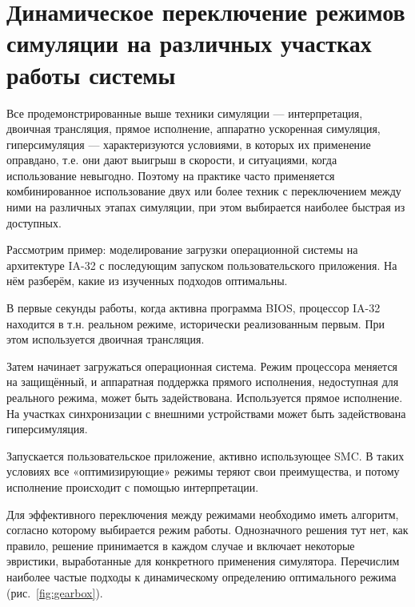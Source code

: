 \section[Динамическое  переключение режимов симуляции]{Динамическое  переключение режимов симуляции на различных участках работы системы}

Все продемонстрированные выше техники симуляции --- интерпретация, двоичная трансляция, прямое исполнение, аппаратно ускоренная симуляция, гиперсимуляция ---  характеризуются условиями, в которых их применение оправдано, т.е. они дают выигрыш в скорости, и ситуациями, когда использование невыгодно. Поэтому на практике часто применяется комбинированное использование двух или более техник с переключением между ними на различных этапах симуляции, при этом выбирается наиболее быстрая из доступных. 

Рассмотрим пример: моделирование загрузки операционной системы на архитектуре IA-32 с последующим запуском пользовательского приложения. На нём разберём, какие из изученных подходов оптимальны.
 
\begin{itemize*}
\item В первые секунды работы, когда активна программа BIOS, процессор IA-32 находится в т.н. реальном режиме, исторически реализованным первым. При этом используется двоичная трансляция. 

\item Затем начинает загружаться операционная система. Режим процессора меняется на защищённый, и аппаратная поддержка прямого исполнения, недоступная для реального режима, может быть задействована. Используется прямое исполнение. На участках синхронизации с внешними устройствами может быть задействована гиперсимуляция.

\item Запускается пользовательское приложение, активно использующее SMC. В таких условиях все «оптимизирующие» режимы теряют свои преимущества, и потому исполнение происходит с помощью интерпретации.

\end{itemize*}

Для эффективного переключения между режимами необходимо иметь алгоритм, согласно которому выбирается режим работы. Однозначного решения тут нет, как правило, решение принимается в каждом случае и включает некоторые эвристики, выработанные для конкретного применения симулятора. Перечислим наиболее частые подходы к динамическому определению оптимального режима (рис.~\ref{fig:gearbox}).

